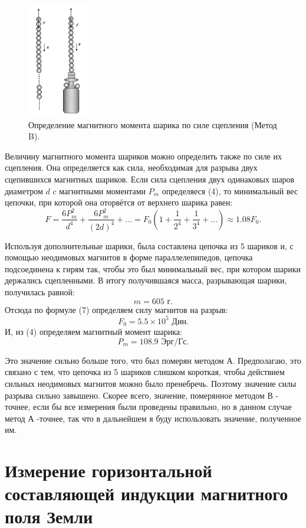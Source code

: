 \documentclass[a4paper, 14pt]{extarticle}%
\newcommand\ECaption[1]{%
     \captionsetup{font=footnotesize}%
     \caption{#1}}
\begin{document}
\begin{figure}
\begin{center}
\includegraphics[height=5cm]{teor.png}
\end{center}
\ECaption{Определение магнитного момента шарика по силе
сцепления (Метод B).}
\end{figure}

Величину магнитного момента шариков можно
определить также по силе их сцепления. Она определяется как
сила, необходимая для разрыва двух сцепившихся магнитных
шариков. Если сила сцепления двух одинаковых шаров диаметром $d$ c магнитными моментами $P_m$ определяеся (4), то минимальный вес цепочки, при которой она оторвётся от верхнего шарика равен:
\begin{equation}
F = \frac{6P_m^2}{d^4} + \frac{6P_m^2}{(2d)^4} + ... = F_0\left(1+ \frac{1}{2^4}+\frac{1}{3^4}+...\right) \approx 1.08F_0.
\end{equation}

Используя дополнительные шарики, была составлена цепочка из 5 шариков и, с помощью
неодимовых магнитов в форме параллелепипедов, цепочка подсоединена к гирям так, чтобы это был минимальный вес, при котором шарики держались сцепленными. В итогу получившаяся масса, разрывающая шарики, получилась равной:
\[m = 605 \text{ г}.\]
Отсюда по формуле (7) определяем силу магнитов на разрыв:
\[F_0 = 5.5\times 10^5 \text{ Дин}. \]
И, из (4) определяем магнитный момент шарика:
\[P_m = 108.9 \text{ Эрг/Гс}.\]

Это значение сильно больше того, что был померян методом А. Предполагаю, это связано с тем, что цепочка из 5 шариков слишком короткая, чтобы действием сильных неодимовых магнитов можно было пренебречь. Поэтому значение силы разрыва сильно завышено. Скорее всего, значение, померянное методом В - точнее, если бы все измерения были проведены правильно, но в данном случае метод А -точнее, так что в дальнейшем я буду использовать значение, полученное им.

\section*{Измерение горизонтальной составляющей индукции магнитного поля Земли}
\end{document}
